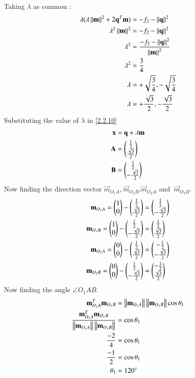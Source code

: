 \documentclass[journal,12pt,twocolumn]{IEEEtran}
\begin{document}
Taking $\lambda$ as common :
\begin{align}
\lambda(\lambda\left\lVert\mathbf{m}\right\rVert^2+2\mathbf{q}^T\mathbf{m})&= -f_2-\left\lVert\mathbf{q}\right\rVert^2\\
\lambda^2\left\lVert\mathbf{m}\right\rVert^2&= -f_2-\left\lVert\mathbf{q}\right\rVert^2\\
\lambda^2&= \frac{-f_2-\left\lVert\mathbf{q}\right\rVert^2}{\left\lVert\mathbf{m}\right\rVert^2} \\
\lambda^2&= \frac{3}{4} \\
\lambda&= +\sqrt{\frac{3}{4}},-\sqrt{\frac{3}{4}} \\
\lambda&= +\frac{\sqrt{3}}{2},-\frac{\sqrt{3}}{2} 
\end{align}
Substituting the value of $\lambda$ in \eqref{2.2.10}
\begin{align}
\mathbf{x}&= \mathbf{q}+\lambda\mathbf{m} \\
\mathbf{A}&= \begin{pmatrix}\frac{1}{2} \\ \frac{\sqrt{3}}{2}\end{pmatrix} \\
\mathbf{B}&= \begin{pmatrix}\frac{1}{2} \\ -\frac{\sqrt{3}}{2}\end{pmatrix}
\end{align} 
Now finding the direction vector $ \vec{m}_{O_1A}$,$\
\vec{m}_{O_1B}$,$ \vec{m}_{O_2A}$ and $\ \vec{m}_{O_2B}$.
\begin{align}
\mathbf{m}_{O_1A}=\begin{pmatrix}1\\0\end{pmatrix}-\begin{pmatrix}\frac{1}{2} \\ \frac{\sqrt{3}}{2}\end{pmatrix}&=\begin{pmatrix}\frac{1}{2}\\-\frac{\sqrt{3}}{2}\end{pmatrix}\\
\mathbf{m}_{O_1B}=\begin{pmatrix}1\\0\end{pmatrix}-\begin{pmatrix}\frac{1}{2} \\ -\frac{\sqrt{3}}{2}\end{pmatrix}&=\begin{pmatrix}\frac{1}{2}\\\frac{\sqrt{3}}{2}\end{pmatrix}\\
\mathbf{m}_{O_2A}=\begin{pmatrix}0\\0\end{pmatrix}-\begin{pmatrix}\frac{1}{2} \\ \frac{\sqrt{3}}{2}\end{pmatrix}&=\begin{pmatrix}-\frac{1}{2}\\-\frac{\sqrt{3}}{2}\end{pmatrix}\\
\mathbf{m}_{O_2B}=\begin{pmatrix}0\\0\end{pmatrix}-\begin{pmatrix}\frac{1}{2} \\ -\frac{\sqrt{3}}{2}\end{pmatrix}&=\begin{pmatrix}-\frac{1}{2}\\\frac{\sqrt{3}}{2}\end{pmatrix}
\end{align}
Now finding the angle $\angle{O_1AB}$.
\begin{align}
\mathbf{m}_{O_1A}^T \mathbf{m}_{O_1B}&=\left\lVert \mathbf{m}_{O_1A}\right\rVert\left\lVert\mathbf{m}_{O_1B}\right\rVert\cos\theta_1\\
\frac{\mathbf{m}_{O_1A}^T \mathbf{m}_{O_1B}}{\left\lVert \mathbf{m}_{O_1A}\right\rVert\left\lVert\mathbf{m}_{O_1B}\right\rVert}&=\cos\theta_1\\
\frac{-2}{4}&=\cos\theta_1\\
\frac{-1}{2}&=\cos\theta_1\\
\theta_1&=120^{\circ}
\end{align}
\end{document}
